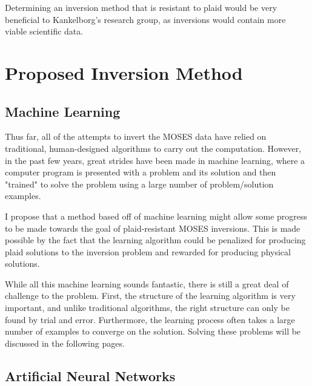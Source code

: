 \documentclass[twoside]{article}
\begin{document}
\begin{multicols}{2}
Determining an inversion method that is resistant to plaid would be very beneficial to Kankelborg's research group, as inversions would contain more viable scientific data.

\section{Proposed Inversion Method}
\subsection{Machine Learning}
Thus far, all of the attempts to invert the MOSES data have relied on traditional, human-designed algorithms to carry out the computation. However, in the past few years, great strides have been made in machine learning, where a computer program is presented with a problem and its solution and then "trained" to solve the problem using a large number of  problem/solution examples. \par I propose that a method based off of machine learning might allow some progress to be made towards the goal of plaid-resistant MOSES inversions. This is made possible by the fact that the learning algorithm could be penalized for producing plaid solutions to the inversion problem and rewarded for producing physical solutions.  \par While all this machine learning sounds fantastic, there is still a great deal of challenge to the problem. First, the structure of the learning algorithm is very important, and unlike traditional algorithms, the right structure can only be found by trial and error. Furthermore, the learning process often takes a large number of examples to converge on the solution. Solving these problems will be discussed in the following pages.

\subsection{Artificial Neural Networks}


\end{multicols}
\end{document}
